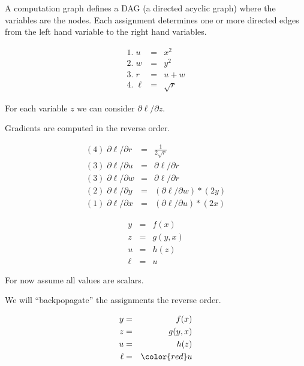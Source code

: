 {\vfill
A computation graph defines a DAG (a directed acyclic graph) where the variables are the nodes. Each assignment determines
one or more directed edges from the left hand variable to the right hand variables.

\vspace{-1ex}
$$\begin{array}{lcl}
 1.\;u & = & x^2  \\
 2.\;w & = & y^2 \\
 3.\;r & =& u + w \\
  4.\;\ell & = & \sqrt{r}
\end{array}$$

\vfill
For each variable $z$ we can consider $\partial \ell/\partial z$.

\vfill
Gradients are computed in the reverse order.

\vfill
$$\begin{array}{lcl}
(4)\; \partial\ell/\partial r & = & \frac{1}{2\sqrt{r}} \\
(3)\; \partial\ell/\partial u & = & \partial \ell/\partial r \\
(3)\; \partial\ell/\partial w & = & \partial \ell/\partial r\\
(2)\; \partial\ell/\partial y & = & (\partial \ell/\partial w) * (2y) \\
(1)\; \partial\ell/\partial x & = & (\partial \ell/\partial u) * (2x)
\end{array}$$

\vspace{-3ex}
\begin{eqnarray*}
  y & = & f(x) \\
  z & = & g(y,x) \\
  u & = & h(z) \\
  \ell & = & u
\end{eqnarray*}

\medskip
For now assume all values are scalars.

\medskip
We will ``backpopagate'' the assignments the reverse order.

\vspace{-3ex}
\begin{eqnarray*}
  y & = & f(x) \\
  z & = & g(y,x) \\
  u & = & h(z) \\
  \ell &  = & {\color{red} u}
\end{eqnarray*}

}
